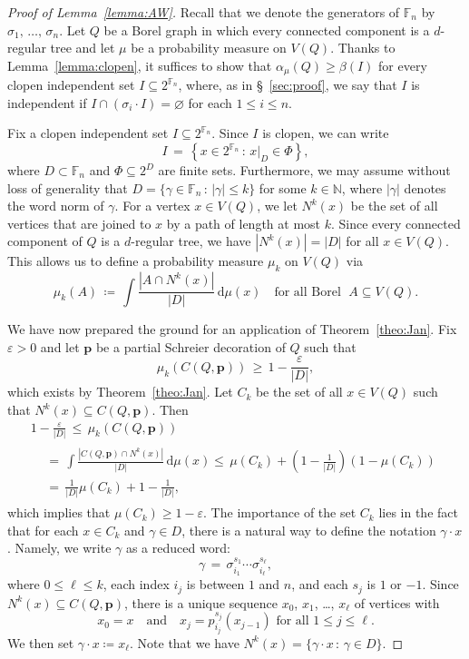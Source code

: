 \documentclass[10pt]{amsart}
\theoremstyle{definition}
\newcommand{\0}{\varnothing}
\newcommand{\set}[1]{\{#1\}}
\renewcommand{\epsilon}{\varepsilon}
\renewcommand{\leq}{\leqslant}
\renewcommand{\geq}{\geqslant}
\newcommand{\defeq}{\coloneqq}
\newcommand{\rest}[2]{{{#1}\vert_{#2}}}
\newcommand{\N}{{\mathbb{N}}}
\newcommand{\F}{\mathbb{F}}
\newcommand{\rmd}{\mathrm{d}}
\begin{document}
\begin{proof}[{Proof of Lemma~\ref{lemma:AW}}]
Recall that we denote the generators of $\F_n$ by $\sigma_1,\, \ldots, \,\sigma_n$. Let $Q$ be a Borel graph in which every connected component is a $d$-regular tree and let $\mu$ be a probability measure on $V(Q)$. Thanks to Lemma~\ref{lemma:clopen}, it suffices to show that $\alpha_\mu(Q) \geq \beta(I)$ for every clopen independent set $I \subseteq 2^{\F_n}$, where, as in \S~\ref{sec:proof}, we say that $I$ is independent if $I \cap (\sigma_i \cdot I) = \0$ for each $1 \leq i \leq n$.

Fix a clopen independent set $I \subseteq 2^{\F_n}$. Since $I$ is clopen, we can write
\[
I \,=\, \left\{x \in 2^{\F_n} \,:\, \rest{x}{D} \in \Phi\right\},
\]
where $D \subset \F_n$ and $\Phi \subseteq 2^D$ are finite sets. Furthermore, we may assume without loss of generality that $D = \set{\gamma \in \F_n \,:\, |\gamma| \leq k}$ for some $k \in \N$, where $|\gamma|$ denotes the word norm of $\gamma$. For a vertex $x \in V(Q)$, we let $N^k(x)$ be the set of all vertices that are joined to $x$ by a path of length at most $k$. Since every connected component of $Q$ is a $d$-regular tree, we have $|N^k(x)| = |D|$ for all $x \in V(Q)$. This allows us to define a probability measure $\mu_k$ on $V(Q)$ via
\[
\mu_k(A) \,
\defeq\, \int \frac{\left|A \cap N^k(x)\right|}{|D|} \,\rmd\mu(x) \quad \text{for all Borel }\; A \subseteq V(Q).
\]

We have now prepared the ground for an application of Theorem~\ref{theo:Jan}. Fix $\epsilon > 0$ and let $\bm{p}$ be a partial Schreier decoration of $Q$ such that
\[
\mu_k(C(Q, \bm{p})) \,\geq\, 1 - \frac{\epsilon}{|D|},
\]
which exists by Theorem~\ref{theo:Jan}. Let $C_k$ be the set of all $x \in V(Q)$ such that $N^k(x) \subseteq C(Q, \bm{p})$. Then
\begin{multline*}
1 - \frac{\epsilon}{|D|} \,\leq\, \mu_k\left(C\left(Q, \bm{p}\right)\right) \\
\begin{aligned}
&=\, \int \frac{\left|C\left(Q, \bm{p}\right) \cap N^k(x)\right|}{|D|} \,\rmd\mu(x)
\leq\, \mu(C_k) + \left(1 - \frac{1}{|D|}\right)\left(1 - \mu\left(C_k\right)\right)\\
&=\, \frac{1}{|D|} \mu(C_k) + 1 - \frac{1}{|D|},
\end{aligned}
\end{multline*}
which implies that $\mu(C_k) \geq 1 - \epsilon$. The importance of the set $C_k$ lies in the fact that for each $x \in C_k$ and $\gamma \in D$, there is a natural way to define the notation $\gamma \cdot x$. Namely, we write $\gamma$ as a reduced word:
\[
\gamma \,=\, \sigma_{i_1}^{s_1} \cdots \sigma_{i_\ell}^{s_\ell},
\]
where $0 \leq \ell \leq k$, each index $i_j$ is between $1$ and $n$, and each $s_j$ is $1$ or $-1$. Since $N^k(x) \subseteq C(Q, \bm{p})$, there is a unique sequence $x_0$, $x_1$, \ldots, $x_\ell$ of vertices with
\[
x_0 = x \quad \text{and} \quad x_{j} = p_{i_j}^{s_j}\left(x_{j-1}\right) \text{ for all } 1 \leq j \leq \ell.
\]
We then set $\gamma \cdot x
\defeq x_\ell$. Note that we have $N^k(x) = \set{\gamma \cdot x \,:\, \gamma \in D}$.


\end{proof}
\end{document}
